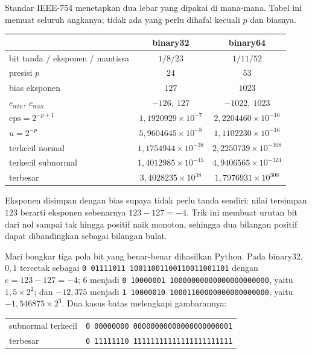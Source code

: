 Standar IEEE-754 menetapkan dua lebar yang dipakai di mana-mana. Tabel ini memuat
seluruh angkanya; tidak ada yang perlu dihafal kecuali $p$ dan biasnya.

\begin{center}
\begin{tabular}{lcc}
\hline
 & binary32 & binary64 \\
\hline
bit tanda / eksponen / mantissa & $1/8/23$ & $1/11/52$ \\
presisi $p$ & $24$ & $53$ \\
bias eksponen & $127$ & $1023$ \\
$e_{\min},\ e_{\max}$ & $-126,\ 127$ & $-1022,\ 1023$ \\
$\mathrm{eps}=2^{-p+1}$ & $1{,}1920929\times10^{-7}$ & $2{,}2204460\times10^{-16}$ \\
$u=2^{-p}$ & $5{,}9604645\times10^{-8}$ & $1{,}1102230\times10^{-16}$ \\
terkecil normal & $1{,}1754944\times10^{-38}$ & $2{,}2250739\times10^{-308}$ \\
terkecil subnormal & $1{,}4012985\times10^{-45}$ & $4{,}9406565\times10^{-324}$ \\
terbesar & $3{,}4028235\times10^{38}$ & $1{,}7976931\times10^{308}$ \\
\hline
\end{tabular}
\end{center}

Eksponen disimpan dengan bias supaya tidak perlu tanda sendiri: nilai tersimpan $123$
berarti eksponen sebenarnya $123-127=-4$. Trik ini membuat urutan bit dari nol sampai
tak hingga positif naik monoton, sehingga dua bilangan positif dapat dibandingkan
sebagai bilangan bulat.

Mari bongkar tiga pola bit yang benar-benar dihasilkan Python. Pada binary32,
$0{,}1$ tercetak sebagai \texttt{0 01111011 10011001100110011001101} dengan
$e=123-127=-4$; $6$ menjadi \texttt{0 10000001 10000000000000000000000}, yaitu
$1{,}5\times2^{2}$; dan $-12{,}375$ menjadi
\texttt{1 10000010 10001100000000000000000}, yaitu $-1{,}546875\times2^{3}$.
Dua kasus batas melengkapi gambarannya:

\begin{center}
\begin{tabular}{ll}
\hline
subnormal terkecil & \texttt{0 00000000 00000000000000000000001} \\
terbesar & \texttt{0 11111110 11111111111111111111111} \\
\hline
\end{tabular}
\end{center}

